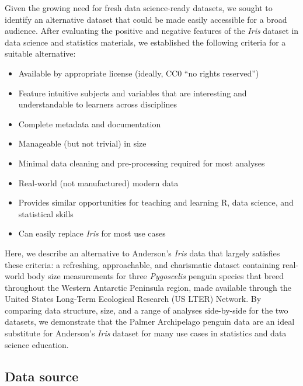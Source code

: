 Given the growing need for fresh data science-ready datasets, we sought
to identify an alternative dataset that could be made easily accessible
for a broad audience. After evaluating the positive and negative
features of the \emph{Iris} dataset in data science and statistics
materials, we established the following criteria for a suitable
alternative:

\begin{itemize}
\tightlist
\item
  Available by appropriate license (ideally, CC0 ``no rights reserved'')
\item
  Feature intuitive subjects and variables that are interesting and
  understandable to learners across disciplines
\item
  Complete metadata and documentation
\item
  Manageable (but not trivial) in size
\item
  Minimal data cleaning and pre-processing required for most analyses
\item
  Real-world (not manufactured) modern data
\item
  Provides similar opportunities for teaching and learning R, data
  science, and statistical skills
\item
  Can easily replace \emph{Iris} for most use cases
\end{itemize}

Here, we describe an alternative to Anderson's \emph{Iris} data that
largely satisfies these criteria: a refreshing, approachable, and
charismatic dataset containing real-world body size measurements for
three \emph{Pygoscelis} penguin species that breed throughout the
Western Antarctic Peninsula region, made available through the United
States Long-Term Ecological Research (US LTER) Network. By comparing
data structure, size, and a range of analyses side-by-side for the two
datasets, we demonstrate that the Palmer Archipelago penguin data are an
ideal substitute for Anderson's \emph{Iris} dataset for many use cases
in statistics and data science education.

\hypertarget{data-source}{%
\subsection{Data source}\label{data-source}}

